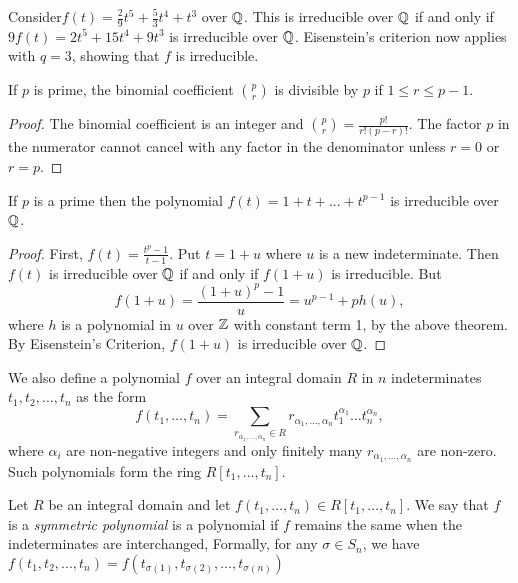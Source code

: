 \begin{example}
Consider$
f(t) = \frac{2}{9} t^5 + \frac{5}{3} t^4 + t^3 
$ over $\mathbb Q$. This is irreducible over $\mathbb Q$ if and only if $
9f(t) = 2t^5 + 15t^4 + 9t^3
$
is irreducible over $\mathbb Q$. Eisenstein's criterion now applies with $q = 3$, showing that $f$ is irreducible.
\end{example}

\begin{theorem}
If $p$ is prime, the binomial coefficient $\binom{p}{r}$ is divisible by $p$ if $1 \le r \le p-1$.
\end{theorem}

\begin{proof}
The binomial coefficient is an integer and $\binom{p}{r} = \frac{p!}{r!(p-r)!}$. The factor $p$ in the numerator cannot cancel with any factor in the denominator unless $r=0$ or $r=p$.
\end{proof}

\begin{theorem}\label{thm:irreducible-prime-polynomial}
    If $p$ is a prime then the polynomial
    $
    f(t) = 1 + t + ... + t^{p-1}
    $
    is irreducible over $\mathbb Q$.
\end{theorem}

\begin{proof}
First, $f(t) = \frac{t^p - 1}{t - 1}$. Put $t = 1 + u$ where $u$ is a new indeterminate. Then $f(t)$ is irreducible over $\mathbb Q$ if and only if $f(1+u)$ is irreducible. But
$$
f(1+u) = \frac{(1+u)^p - 1}{u}  = u^{p-1} + ph(u),
$$
where $h$ is a polynomial in $u$ over $\mathbb Z$ with constant term 1, by the above theorem. By Eisenstein's Criterion, $f(1+u)$ is irreducible over $\mathbb Q$.
\end{proof}

We also define a polynomial $f$ over an integral domain $R$ in $n$ indeterminates $t_1, t_2, \dots, t_n$ as the form 
$$
f(t_1, \dots, t_n) = \sum _{ r_{\alpha_1, \dots, \alpha_n} \in R}  r_{\alpha_1, \dots, \alpha_n} t_1^{\alpha_1} \dots t_n ^{\alpha_n},
$$
where $\alpha_i$ are non-negative integers and only finitely many $r_{\alpha_1, \dots, \alpha_n}$ are non-zero. Such polynomials form the ring $R[t_1, \dots, t_n]$.

\begin{definition}
	Let $R$ be an integral domain and let $f(t_1, \dots, t_n) \in R[t_1, \dots, t_n]$. We say that $f$ is
    a \textit{symmetric polynomial} is a polynomial if $f$ remains the same when the indeterminates are interchanged,
    Formally, for any $\sigma \in S_n$, we have $f(t_1,t_2,...,t_n) = f(t_{\sigma(1)},t_{\sigma(2)},...,t_{\sigma(n)})$
\end{definition}

